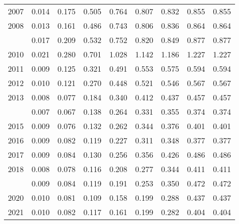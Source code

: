 \documentclass[
]{article}
\begin{document}
\begin{longtable}[t]{lrrrrrrrr}
2007 & 0.014 & 0.175 & 0.505 & 0.764 & 0.807 & 0.832 & 0.855 & 0.855\\
2008 & 0.013 & 0.161 & 0.486 & 0.743 & 0.806 & 0.836 & 0.864 & 0.864\\
\addlinespace
2009 & 0.017 & 0.209 & 0.532 & 0.752 & 0.820 & 0.849 & 0.877 & 0.877\\
2010 & 0.021 & 0.280 & 0.701 & 1.028 & 1.142 & 1.186 & 1.227 & 1.227\\
2011 & 0.009 & 0.125 & 0.321 & 0.491 & 0.553 & 0.575 & 0.594 & 0.594\\
2012 & 0.010 & 0.121 & 0.270 & 0.448 & 0.521 & 0.546 & 0.567 & 0.567\\
2013 & 0.008 & 0.077 & 0.184 & 0.340 & 0.412 & 0.437 & 0.457 & 0.457\\
\addlinespace
2014 & 0.007 & 0.067 & 0.138 & 0.264 & 0.331 & 0.355 & 0.374 & 0.374\\
2015 & 0.009 & 0.076 & 0.132 & 0.262 & 0.344 & 0.376 & 0.401 & 0.401\\
2016 & 0.009 & 0.082 & 0.119 & 0.227 & 0.311 & 0.348 & 0.377 & 0.377\\
2017 & 0.009 & 0.084 & 0.130 & 0.256 & 0.356 & 0.426 & 0.486 & 0.486\\
2018 & 0.008 & 0.078 & 0.116 & 0.208 & 0.277 & 0.344 & 0.411 & 0.411\\
\addlinespace
2019 & 0.009 & 0.084 & 0.119 & 0.191 & 0.253 & 0.350 & 0.472 & 0.472\\
2020 & 0.010 & 0.081 & 0.109 & 0.158 & 0.199 & 0.288 & 0.437 & 0.437\\
2021 & 0.010 & 0.082 & 0.117 & 0.161 & 0.199 & 0.282 & 0.404 & 0.404\\*
\end{longtable}
\end{document}
